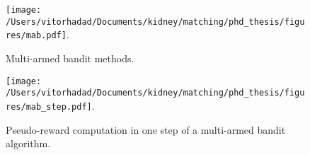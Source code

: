 \documentclass[12pt]{article}
\begin{document}
 

 \begin{figure}
 \centering
 \hspace*{-1cm}
 \texttt{[image: /Users/vitorhadad/Documents/kidney/matching/phd\_thesis/figures/mab.pdf]}.
 \caption{Multi-armed bandit methods.}
 \label{fig:mab}
 \end{figure}

 \begin{figure}
 \centering
 \texttt{[image: /Users/vitorhadad/Documents/kidney/matching/phd\_thesis/figures/mab\_step.pdf]}.
 \caption{Pseudo-reward computation in one step of a multi-armed bandit algorithm.}
 \label{fig:mab_step}
 \end{figure}
 
  




% 
% 
% 
% 
% 
% 
% 
% 
\end{document}

